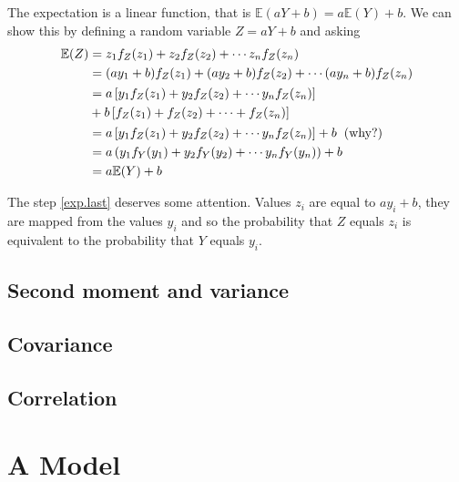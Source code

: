 The expectation is a linear function, that is $\mathbb{E}(aY + b) = a\mathbb{E}(Y) + b $. 
We can show this by defining a random variable $Z = aY+b$ and asking 
\begin{align}
    \mathbb{E}(Z) &= z_{1} f_{Z}(z_{1}) + z_{2} f_{Z}(z_{2}) + \cdots z_{n} f_{Z}(z_{n})\\
                  &=  (ay_{1}+b) f_{Z}(z_{1}) + (ay_{2}+b) f_{Z}(z_{2})+ \cdots (ay_{n}+b) f_{Z}(z_{n})\\
                  & \begin{aligned}
                  &= a \left[ y_{1}f_{Z}(z_{1}) + y_{2}f_{Z}(z_{2}) + \cdots y_{n}f_{Z}(z_{n}) \right] \\
                  &+ b\left[f_{Z}(z_{1}) + f_{Z}(z_{2}) + \cdots + f_{Z}(z_{n}) \right]
                  \end{aligned} \\
                  &= a \left[ y_{1}f_{Z}(z_{1}) + y_{2}f_{Z}(z_{2}) + \cdots y_{n}f_{Z}(z_{n}) \right] + b \hspace{2mm} \text{(why?)} \\
                  &= a \left( y_{1}f_{Y}(y_{1}) + y_{2}f_{Y}(y_{2}) + \cdots y_{n}f_{Y}(y_{n}) \right) + b \label{exp.last} \\
                  &= a \mathbb{E}(Y) + b 
\end{align}

The step \eqref{exp.last} deserves some attention. Values $z_{i}$ are equal to $ay_{i} + b$, they are mapped from the values $y_{i}$ and so the probability that $Z$ equals $z_{i}$ is equivalent to the probability that $Y$ equals $y_{i}$.  

\subsection{Second moment and variance}


\subsection{Covariance}

\subsection{Correlation}


\section{A Model}




